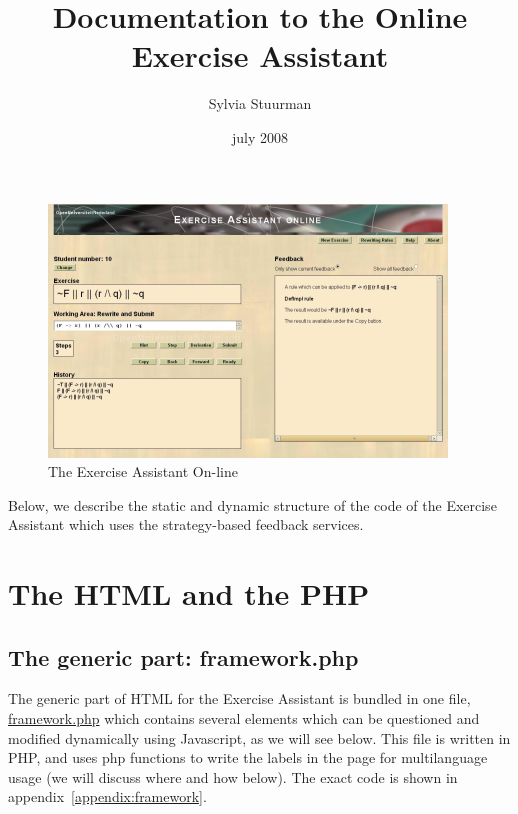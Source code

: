 \documentclass{article}
\begin{document}
\addtolength{\parskip}{0.2cm}
\newcommand{\todoservice}[1]{\vspace{0.2cm} \large \textbf{\underline{TODO Services:}}\\ \normalsize #1 }
\newcommand{\todoapp}[1]{\vspace{0.2cm} \large \textbf{\underline{TODO Application:}}\\ \normalsize #1 }
\title{Documentation to the Online Exercise Assistant}
\author{Sylvia Stuurman}
\date{july 2008}
\maketitle
\begin{figure}[h]
\begin{center}
\includegraphics{figures/page-elements.png}
\end{center}
\caption{The Exercise Assistant On-line}\label{figure:screenshot}
\end{figure}
Below, we describe the static and dynamic structure of the code of the Exercise Assistant which uses the strategy-based feedback services.

\section{The HTML and the PHP}
\subsection{The generic part: framework.php}
The generic part of HTML for the Exercise Assistant is bundled in one file, \url{framework.php} which contains several elements which can be questioned and modified dynamically using Javascript, as we will see below. This file is written in PHP, and uses php functions to write the labels in the page for multilanguage usage (we will discuss where and how below). The exact code is shown in appendix~\ref{appendix:framework}. 
\end{document}
